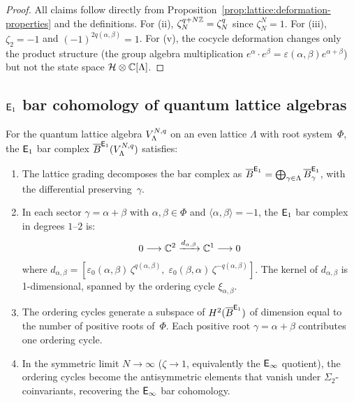 \begin{proof}
All claims follow directly from
Proposition~\ref{prop:lattice:deformation-properties} and the
definitions.  For (ii), $\zeta_N^{q + N\mathbb{Z}} = \zeta_N^q$ since
$\zeta_N^N = 1$.  For (iii), $\zeta_2 = -1$ and
$(-1)^{2q(\alpha,\beta)} = 1$.  For (v), the cocycle deformation
changes only the product structure (the group algebra multiplication
$e^\alpha \cdot e^\beta = \varepsilon(\alpha,\beta) e^{\alpha+\beta}$)
but not the state space $\mathcal{H} \otimes \mathbb{C}[\Lambda]$.
\end{proof}


\subsection{$\mathsf{E}_1$ bar cohomology of quantum lattice algebras}

\begin{theorem}
\label{thm:lattice:e1-bar-cohomology}
For the quantum lattice algebra $V_\Lambda^{N,q}$ on an even
lattice $\Lambda$ with root system~$\Phi$, the $\mathsf{E}_1$ bar complex
$\overline{B}^{\mathsf{E}_1}(V_\Lambda^{N,q})$ satisfies:
\begin{enumerate}[label=(\roman*)]
\item The lattice grading decomposes the bar complex as
  $\overline{B}^{\mathsf{E}_1} = \bigoplus_{\gamma \in \Lambda}
  \overline{B}^{\mathsf{E}_1}_\gamma$, with the differential
  preserving~$\gamma$.
\item In each sector $\gamma = \alpha + \beta$ with
  $\alpha, \beta \in \Phi$ and $\langle\alpha,\beta\rangle = -1$,
  the $\mathsf{E}_1$ bar complex in degrees $1$--$2$ is:
  \[
  0 \longrightarrow \mathbb{C}^2
    \xrightarrow{d_{\alpha,\beta}}
    \mathbb{C}^1 \longrightarrow 0
  \]
  where $d_{\alpha,\beta}
  = [\varepsilon_0(\alpha,\beta)\,\zeta^{q(\alpha,\beta)},\;
     \varepsilon_0(\beta,\alpha)\,\zeta^{-q(\alpha,\beta)}]$.
  The kernel of $d_{\alpha,\beta}$ is 1-dimensional, spanned by the
  ordering cycle $\xi_{\alpha,\beta}$.
\item The ordering cycles generate a subspace of
  $H^2(\overline{B}^{\mathsf{E}_1})$ of dimension equal to the number of
  positive roots of~$\Phi$.  Each positive root
  $\gamma = \alpha + \beta$ contributes one ordering cycle.
\item In the symmetric limit $N \to \infty$ \textup{(}$\zeta \to 1$,
  equivalently the $\mathsf{E}_{\infty}$ quotient\textup{)}, the ordering cycles
  become the antisymmetric elements that vanish under
  $\Sigma_2$-coinvariants, recovering the $\mathsf{E}_{\infty}$ bar cohomology.
\end{enumerate}
\end{theorem}

